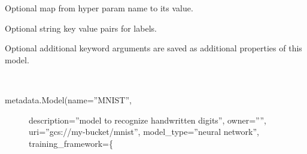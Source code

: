 \documentclass[letterpaper,10pt,english]{sphinxmanual}
\begin{document}
\begin{fulllineitems}
\begin{fulllineitems}
\end{fulllineitems}


\begin{fulllineitems}
\label{\detokenize{source/md:kubeflow.metadata.metadata.Model.hyperparameters}}
Optional map from hyper param name to its value.

\end{fulllineitems}


\begin{fulllineitems}
\label{\detokenize{source/md:kubeflow.metadata.metadata.Model.labels}}
Optional string key value pairs for labels.

\end{fulllineitems}


\begin{fulllineitems}
\label{\detokenize{source/md:kubeflow.metadata.metadata.Model.kwargs}}
Optional additional keyword arguments are saved as additional
properties of this model.

\end{fulllineitems}


\begin{fulllineitems}
\label{\detokenize{source/md:kubeflow.metadata.metadata.Model.example}}~\begin{description}
\item[{metadata.Model(name=”MNIST”,}] \leavevmode
description=”model to recognize handwritten digits”,
owner=””,
uri=”gcs://my-bucket/mnist”,
model\_type=”neural network”,
training\_framework=\{
\begin{quote}


\end{quote}
\end{description}
\end{fulllineitems}
\end{fulllineitems}
\end{document}
